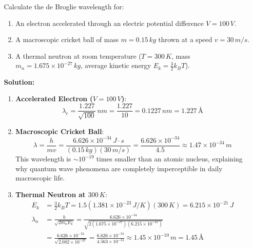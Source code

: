 \begin{example}
Calculate the de Broglie wavelength for:
\begin{enumerate}
    \item An electron accelerated through an electric potential difference $V = 100\,\si{V}$.
    \item A macroscopic cricket ball of mass $m = 0.15\,\si{kg}$ thrown at a speed $v = 30\,\si{m/s}$.
    \item A thermal neutron at room temperature ($T = 300\,\si{K}$, mass $m_n = 1.675 \times 10^{-27}\,\si{kg}$, average kinetic energy $E_k = \frac{3}{2}k_B T$).
\end{enumerate}

\textbf{Solution:}
\begin{enumerate}
    \item \textbf{Accelerated Electron ($V = 100\,\si{V}$)}:
    \begin{equation*}
        \lambda_e = \frac{1.227}{\sqrt{100}}\,\si{nm} = \frac{1.227}{10} = 0.1227\,\si{nm} = 1.227\,\si{\text{\AA}}
    \end{equation*}
    
    \item \textbf{Macroscopic Cricket Ball}:
    \begin{equation*}
        \lambda = \frac{h}{m v} = \frac{6.626 \times 10^{-34}\,\si{J\cdot s}}{(0.15\,\si{kg})(30\,\si{m/s})} = \frac{6.626 \times 10^{-34}}{4.5} \approx 1.47 \times 10^{-34}\,\si{m}
    \end{equation*}
    This wavelength is $\sim 10^{-19}$ times smaller than an atomic nucleus, explaining why quantum wave phenomena are completely imperceptible in daily macroscopic life.
    
    \item \textbf{Thermal Neutron at $300\,\si{K}$}:
    \begin{align*}
        E_k &= \frac{3}{2}k_B T = 1.5(1.381 \times 10^{-23}\,\si{J/K})(300\,\si{K}) = 6.215 \times 10^{-21}\,\si{J} \\
        \lambda_n &= \frac{h}{\sqrt{2m_n E_k}} = \frac{6.626 \times 10^{-34}}{\sqrt{2(1.675 \times 10^{-27})(6.215 \times 10^{-21})}} \\
        &= \frac{6.626 \times 10^{-34}}{\sqrt{2.082 \times 10^{-47}}} = \frac{6.626 \times 10^{-34}}{4.563 \times 10^{-24}} \approx 1.45 \times 10^{-10}\,\si{m} = 1.45\,\si{\text{\AA}}
    \end{align*}
\end{enumerate}
\end{example}

